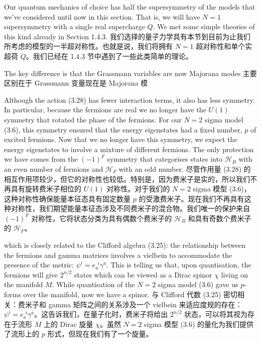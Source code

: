 \documentclass{article}
\begin{document}
\begin{paracol}{2}
Our quantum mechanics of choice has half the supersymmetry of the models that we’ve considered until now in this section. That is, we will have $N = 1$ supersymmetry with a single real supercharge $Q$. We met some simple theories of this kind already in Section 1.4.3.
\switchcolumn
我们选择的量子力学具有本节到目前为止我们所考虑的模型的一半超对称性。也就是说，我们将拥有 $N = 1$ 超对称性和单个实超荷 $Q$。我们已经在 1.4.3 节中遇到了一些此类简单的理论。
\switchcolumn*

The key difference is that the Grassmann variables are now Majorana modes
\switchcolumn
主要区别在于 Grassmann 变量现在是 Majorana 模
\switchcolumn*

Although the action (3.28) has fewer interaction terms, it also has less symmetry. In particular, because the fermions are real we no longer have the $U(1)$ symmetry that rotated the phase of the fermions. For our $N = 2$ sigma model (3.6), this symmetry ensured that the energy eigenstates had a fixed number, $p$ of excited fermions. Now that we no longer have this symmetry, we expect the energy eigenstates to involve a mixture of different fermions. The only protection we have comes from the $(- 1)^F$ symmetry that categorises states into $\mathcal{H}_B$ with an even number of fermions and $\mathcal{H}_F$ with an odd number.
\switchcolumn
尽管作用量 (3.28) 的相互作用项较少，但它的对称性也较低。特别是，因为费米子是实的，所以我们不再具有旋转费米子相位的 $U(1)$ 对称性。对于我们的 $N = 2$ sigma 模型 (3.6)，这种对称性确保能量本征态具有固定数量 $p$ 的受激费米子。现在我们不再具有这种对称性，我们期望能量本征态涉及不同费米子的混合物。我们唯一的保护来自 $(- 1)^F$ 对称性，它将状态分类为具有偶数个费米子的 $\mathcal{H}_B$ 和具有奇数个费米子的 $\mathcal{H}_F$。
\switchcolumn*

which is closely related to the Clifford algebra (3.25): the relationship between the fermions and gamma matrices involves a vielbein to accommodate the presence of the metric: $\psi^i = e_{a}^{\ \ i} \gamma^a$. This is telling us that, upon quantisation, the fermions will give $2^{n/2}$ states which can be viewed as a Dirac spinor $\chi$ living on the manifold $M$. While quantisation of the $N = 2$ sigma model (3.6) gave us $p$-forms over the manifold, now we have a spinor.
\switchcolumn
与 Clifford 代数 (3.25) 密切相关：费米子和 gamma 矩阵之间的关系涉及一个 vielbein 来适应度规的存在： $\psi^i = e_{a}^{\ \ i} \gamma^a$。这告诉我们，在量子化时，费米子将给出 $2^{n/2}$ 状态，可以将其视为存在于流形 $M$ 上的 Dirac 旋量 $\chi$。虽然 $N = 2$ sigma 模型 (3.6) 的量化为我们提供了流形上的 $p$ 形式，但现在我们有了一个旋量。
\switchcolumn*


\end{paracol}
\end{document}
